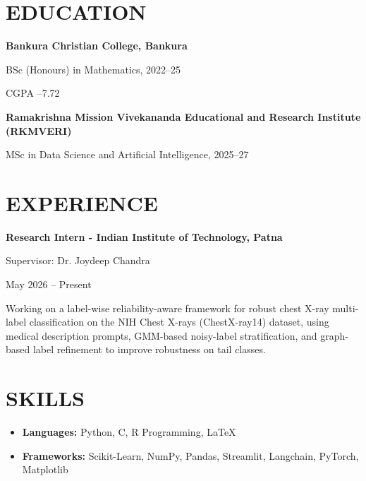 \documentclass[a4paper,9pt]{article}
\begin{document}
\vspace{6pt}


\begin{minipage}[t]{0.37\textwidth}

\section{EDUCATION}

\textbf{Bankura Christian College, Bankura}

BSc (Honours) in Mathematics, 2022--25

CGPA --7.72


\vspace{4pt}

\textbf{Ramakrishna Mission Vivekananda Educational and Research Institute (RKMVERI)}

MSc in Data Science and Artificial Intelligence, 2025--27

\section{EXPERIENCE}

\textbf{Research Intern - Indian Institute of Technology, Patna}

Supervisor: Dr. Joydeep Chandra

{\footnotesize May 2026 -- Present}

Working on a label-wise reliability-aware framework for robust chest X-ray multi-label classification on the NIH Chest X-rays (ChestX-ray14) dataset, using medical description prompts, GMM-based noisy-label stratification, and graph-based label refinement to improve robustness on tail classes.

\section{SKILLS}

\begin{itemize}[leftmargin=*,nosep]

\item \textbf{Languages:} Python, C, R Programming, LaTeX

\item \textbf{Frameworks:} Scikit-Learn, NumPy, Pandas, Streamlit, Langchain, PyTorch, Matplotlib


\end{itemize}
\end{minipage}
\end{document}
